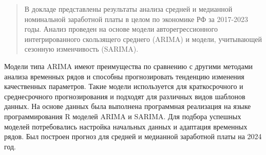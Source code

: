 \begin{abstract}

 

В докладе представлены результаты анализа средней и медианной номинальной заработной платы в целом по экономике РФ за 2017-2023 годы. Анализ проведен на основе модели авторегрессионного интегрированного скользящего среднего  (ARIMA) и модели, учитывающей сезонную изменчивость (SARIMA).

\end{abstract}


Модели типа ARIMA имеют преимущества по сравнению с другими методами анализа временных рядов и способны прогнозировать тенденцию изменения качественных параметров. Такие модели используется для краткосрочного и среднесрочного прогнозирования и подходят для различных видов шаблонов данных. 
На основе данных \cite{gg1} была выполнена  программная реализация на языке программирования R  моделей ARIMA и SARIMA. Для подбора успешных моделей потребовались настройка начальных данных и адаптация временных рядов. Был построен прогноз для средней и медианной
заработной платы на 2024 год.






